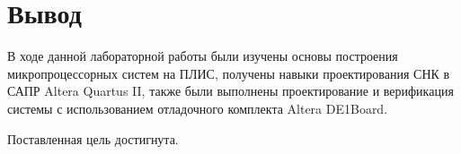\chapter*{Вывод}

В ходе данной лабораторной работы были изучены основы построения микропроцессорных систем на ПЛИС, получены навыки проектирования СНК в САПР Altera Quartus II, также были выполнены проектирование и верификация системы с использованием отладочного комплекта  Altera DE1Board.

Поставленная цель достигнута.
